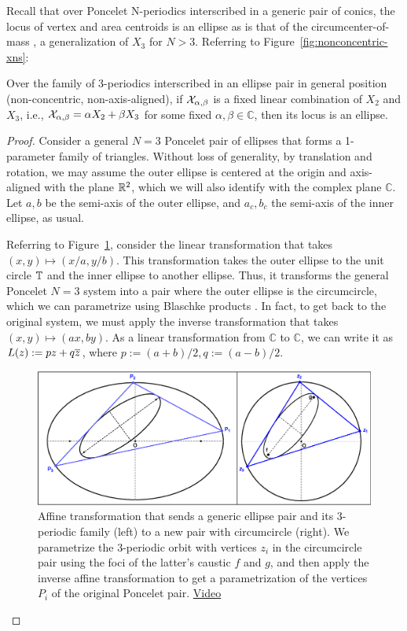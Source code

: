 Recall that over Poncelet N-periodics interscribed in a generic pair of conics, the locus of vertex and area centroids is an ellipse \cite{sergei2016-com} as is that of the circumcenter-of-mass \cite{sergei2014-circumcenter-of-mass}, a generalization of $X_3$ for $N>3$. Referring to Figure~\ref{fig:nonconcentric-xns}:

\begin{theorem}
Over the family of 3-periodics interscribed in an ellipse pair in general position (non-concentric, non-axis-aligned),
if $\mathcal{X}_{\alpha,\beta}$ is a fixed linear combination of $X_2$ and $X_3$, i.e., $\mathcal{X}_{\alpha,\beta}=\alpha X_2+\beta X_3$ for some fixed $\alpha,\beta\in\mathbb{C}$, then its locus is an ellipse. 
\label{thm:ellipse-locus}
\end{theorem}

\begin{proof}

Consider a general $N=3$ Poncelet pair of ellipses that forms a 1-parameter family of triangles. Without loss of generality, by translation and rotation, we may assume the outer ellipse is centered at the origin and axis-aligned with the plane $\mathbb{R}^2$, which we will also identify with the complex plane $\mathbb{C}$. Let $a,b$ be the semi-axis of the outer ellipse, and $a_c,b_c$ the semi-axis of the inner ellipse, as usual. 

Referring to Figure~\ref{fig:affine}, consider the linear transformation that takes $(x,y)\mapsto(x/a,y/b)$. This transformation takes the outer ellipse to the unit circle $\mathbb{T}$ and the inner ellipse to another ellipse. Thus, it transforms the general Poncelet $N=3$ system into a pair where the outer ellipse is the circumcircle, which we can parametrize using Blaschke products \cite{daepp-2019}. In fact, to get back to the original system, we must apply the inverse transformation that takes $(x,y)\mapsto(a x,b y)$. As a linear transformation from $\mathbb{C}$ to $\mathbb{C}$, we can write it as $L(z):=p z+q \overline{z}$, where $p:=(a+b)/2, q:=(a-b)/2$.

\begin{figure}
    \centering
    \includegraphics[width=\textwidth]{pics/0025_affine_circumcircle.eps}
    \caption{Affine transformation that sends a generic ellipse pair and its 3-periodic family (left) to a new pair with circumcircle (right). We parametrize the 3-periodic orbit with vertices $z_i$ in the circumcircle pair using the foci of the latter's caustic $f$ and $g$, and then apply the inverse affine transformation to get a parametrization of the vertices $P_i$ of the original Poncelet pair. \href{https://youtu.be/6xSFBLWIkTM}{Video}}
    \label{fig:affine}
\end{figure}



\end{proof}
